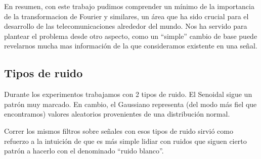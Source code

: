 En resumen, con este trabajo pudimos comprender un m\'inimo de la importancia de la transformacion de Fourier y similares,
un \'area que ha sido crucial para el desarrollo de las telecomunicaciones alrededor del mundo. Nos ha servido para plantear
el problema desde otro aspecto, como un ``simple'' cambio de base puede revelarnos mucha mas informaci\'on de la que 
consideramos existente en una se\~nal. 

\subsection{Tipos de ruido}

Durante los experimentos trabajamos con 2 tipos de ruido. El Senoidal sigue un
patr\'on muy marcado. En cambio, el Gaussiano representa (del modo m\'as fiel
que encontramos) valores aleatorios provenientes de una distribuci\'on normal.

Correr los mismos filtros sobre se\~nales con esos tipos de ruido sirvi\'o como
refuerzo a la intuici\'on de que es m\'as simple lidiar con ruidos que siguen
cierto patr\'on a hacerlo con el denominado ``ruido blanco''.
